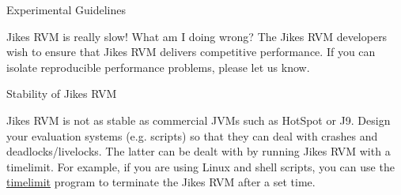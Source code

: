 \begin{section}{Experimental Guidelines}
\begin{subsection}{Jikes RVM is really slow! What am I doing wrong?}
The Jikes RVM developers wish to ensure that Jikes RVM delivers competitive performance. If you can isolate reproducible performance problems, please let us know.

\end{subsection}

\begin{subsection}{Stability of Jikes RVM}

Jikes RVM is not as stable as commercial JVMs such as HotSpot or J9. Design your evaluation systems (e.g. scripts) so that they can deal with crashes and deadlocks/livelocks. The latter can be dealt with by running Jikes RVM with a timelimit. For example, if you are using Linux and shell scripts, you can use the \href{http://devel.ringlet.net/sysutils/timelimit/}{timelimit} program to terminate the Jikes RVM after a set time.

\end{subsection}

\end{section}
